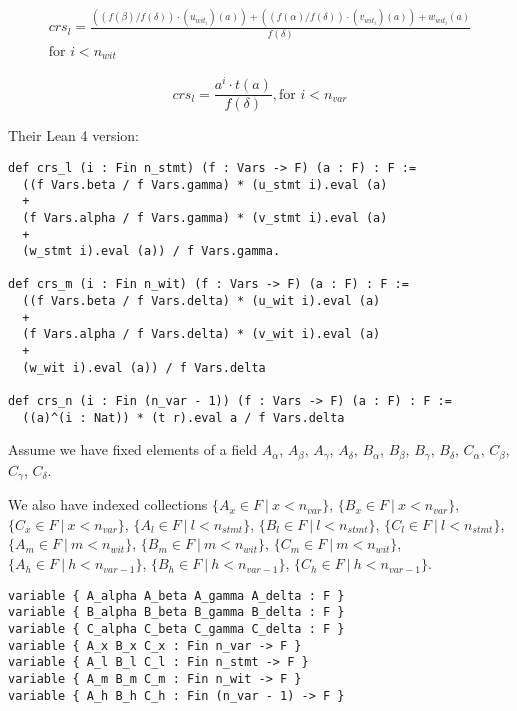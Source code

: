 \documentclass{article}
\theoremstyle{definition}
\theoremstyle{remark}
\begin{document}
\begin{multline}
crs_l = \frac{((f(\beta) / f(\delta)) \cdot (u_{{wit}_i})(a)) + ((f(\alpha) / f(\delta)) \cdot (v_{{wit}_i})(a)) + w_{{wit}_i}(a)}{f(\delta)} \\ \text{for $i < n_{wit}$}
\end{multline}

\begin{equation}
crs_l = \frac{a^i \cdot t(a)}{f(\delta)}, \text{for $i < n_{var}$}
\end{equation}

Their Lean 4 version:

\begin{lstlisting}
def crs_l (i : Fin n_stmt) (f : Vars -> F) (a : F) : F :=
  ((f Vars.beta / f Vars.gamma) * (u_stmt i).eval (a)
  +
  (f Vars.alpha / f Vars.gamma) * (v_stmt i).eval (a)
  +
  (w_stmt i).eval (a)) / f Vars.gamma.

def crs_m (i : Fin n_wit) (f : Vars -> F) (a : F) : F :=
  ((f Vars.beta / f Vars.delta) * (u_wit i).eval (a)
  +
  (f Vars.alpha / f Vars.delta) * (v_wit i).eval (a)
  +
  (w_wit i).eval (a)) / f Vars.delta

def crs_n (i : Fin (n_var - 1)) (f : Vars -> F) (a : F) : F :=
  ((a)^(i : Nat)) * (t r).eval a / f Vars.delta
\end{lstlisting}

Assume we have fixed elements of a field $A_{\alpha}$, $A_{\beta}$, $A_{\gamma}$, $A_{\delta}$, $B_{\alpha}$, $B_{\beta}$, $B_{\gamma}$, $B_{\delta}$, $C_{\alpha}$, $C_{\beta}$, $C_{\gamma}$, $C_{\delta}$.

We also have indexed collections $\{ A_x \in F \: | \: x < n_{var} \}$, $\{ B_x \in F \: | \: x < n_{var} \}$, $\{ C_x \in F \: | \: x < n_{var} \}$, $\{ A_l \in F \: | \: l < n_{stmt} \}$, $\{ B_l \in F \: | \: l < n_{stmt} \}$, $\{ C_l \in F \: | \: l < n_{stmt} \}$, $\{ A_m \in F \: | \: m < n_{wit} \}$, $\{ B_m \in F \: | \: m < n_{wit} \}$, $\{ C_m \in F \: | \: m < n_{wit} \}$, $\{ A_h \in F \: | \: h < n_{var - 1} \}$, $\{ B_h \in F \: | \: h < n_{var - 1} \}$, $\{ C_h \in F \: | \: h < n_{var - 1} \}$.

\begin{lstlisting}
variable { A_alpha A_beta A_gamma A_delta : F }
variable { B_alpha B_beta B_gamma B_delta : F }
variable { C_alpha C_beta C_gamma C_delta : F }
variable { A_x B_x C_x : Fin n_var -> F }
variable { A_l B_l C_l : Fin n_stmt -> F }
variable { A_m B_m C_m : Fin n_wit -> F }
variable { A_h B_h C_h : Fin (n_var - 1) -> F }
\end{lstlisting}
\end{document}
